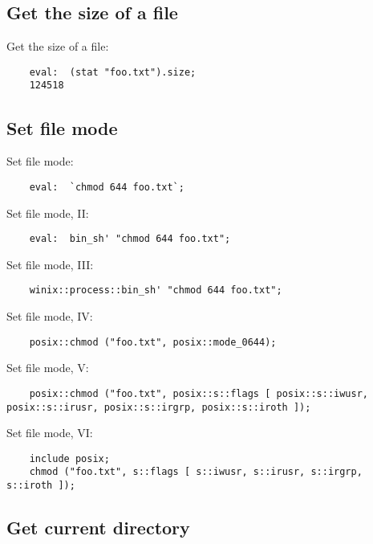 \subsection{Get the size of a file}

Get the size of a file:
\begin{verbatim}
    eval:  (stat "foo.txt").size;
    124518
\end{verbatim}

\cutend*

\subsection{Set file mode}

Set file mode:
\begin{verbatim}
    eval:  `chmod 644 foo.txt`;
\end{verbatim}

Set file mode, II:
\begin{verbatim}
    eval:  bin_sh' "chmod 644 foo.txt";
\end{verbatim}

Set file mode, III:
\begin{verbatim}
    winix::process::bin_sh' "chmod 644 foo.txt";
\end{verbatim}

Set file mode, IV:
\begin{verbatim}
    posix::chmod ("foo.txt", posix::mode_0644);
\end{verbatim}

Set file mode, V:
\begin{verbatim}
    posix::chmod ("foo.txt", posix::s::flags [ posix::s::iwusr, posix::s::irusr, posix::s::irgrp, posix::s::iroth ]);
\end{verbatim}

Set file mode, VI:
\begin{verbatim}
    include posix;
    chmod ("foo.txt", s::flags [ s::iwusr, s::irusr, s::irgrp, s::iroth ]);
\end{verbatim}

\cutend*

\subsection{Get current directory}

